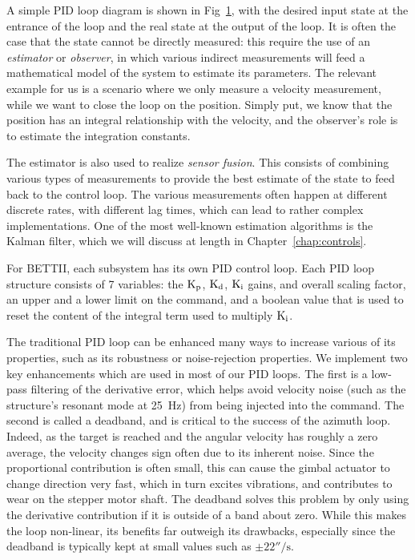 \documentclass{standalone}
\begin{document}
\begin{figure}[!ht]
	\centering
	
	\caption{}
	\label{fig:SimplePID}
    \end{figure}



A simple PID loop diagram is shown in Fig~\ref{fig:SimplePID}, with the desired input state at the entrance of the loop and the real state at the output of the loop. It is often the case that the state cannot be directly measured: this require the use of an \textit{estimator} or \textit{observer}, in which various indirect measurements will feed a mathematical model of the system to estimate its parameters. The relevant example for us is a scenario where we only measure a velocity measurement, while we want to close the loop on the position. Simply put, we know that the position has an integral relationship with the velocity, and the observer's role is to estimate the integration constants.

The estimator is also used to realize \textit{sensor fusion}. This consists of combining various types of measurements to provide the best estimate of the state to feed back to the control loop. The various measurements often happen at different discrete rates, with different lag times, which can lead to rather complex implementations. One of the most well-known estimation algorithms is the Kalman filter, which we will discuss at length in Chapter~\ref{chap:controls}. 

For BETTII, each subsystem has its own PID control loop. Each PID loop structure consists of 7 variables: the $\textrm{K}_\textrm{p}$, $\textrm{K}_\textrm{d}$, $\textrm{K}_\textrm{i}$ gains, and overall scaling factor, an upper and a lower limit on the command, and a boolean value that is used to reset the content of the integral term used to multiply $\textrm{K}_\textrm{i}$. 

The traditional PID loop can be enhanced many ways to increase various of its properties, such as its robustness or noise-rejection properties. We implement two key enhancements which are used in most of our PID loops. The first is a low-pass filtering of the derivative error, which helps avoid velocity noise (such as the structure's resonant mode at \SI{25}{\hertz}) from being injected into the command. The second is called a deadband, and is critical to the success of the azimuth loop. Indeed, as the target is reached and the angular velocity has roughly a zero average, the velocity changes sign often due to its inherent noise. Since the proportional contribution is often small, this can cause the gimbal actuator to change direction very fast, which in turn excites vibrations, and contributes to wear on the stepper motor shaft. The deadband solves this problem by only using the derivative contribution if it is outside of a band about zero. While this makes the loop non-linear, its benefits far outweigh its drawbacks, especially since the deadband is typically kept at small values such as $\pm 2\ang{;;2}\si{\per\second}$.
\end{document}
